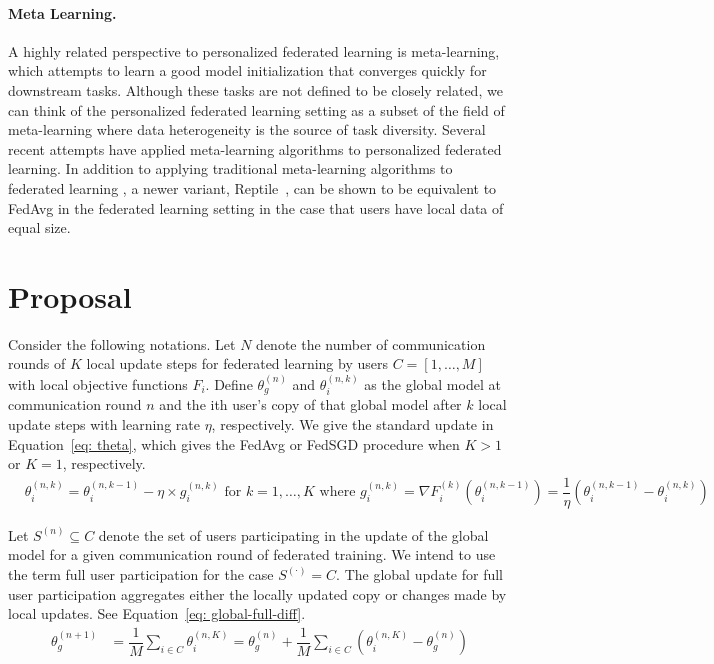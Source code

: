 \documentclass{article}
\begin{document}
%
\paragraph{Meta Learning.}
A highly related perspective to personalized federated learning is meta-learning, which attempts to learn a good model initialization that converges quickly for downstream tasks.
Although these tasks are not defined to be closely related, we can think of the personalized federated learning setting as a subset of the field of meta-learning where data heterogeneity is the source of task diversity. 
Several recent attempts have applied meta-learning algorithms to personalized federated learning.
In addition to applying traditional meta-learning algorithms to federated learning \citep{maml}, a newer variant, Reptile~\citep{reptile}, can be shown to be equivalent to FedAvg in the federated learning setting in the case that users have local data of equal size.




%
\section{Proposal}

Consider the following notations.
Let $N$ denote the number of communication rounds of $K$ local update steps for federated learning by users $C = \left[1, \ldots, M \right]$ with local objective functions $F_i$.
Define $\theta_g^{(n)}$ and $\theta_i^{(n, k)}$ as the global model at communication round $n$ and the ith user's copy of that global model after $k$ local update steps with learning rate $\eta$, respectively.
We give the standard update in Equation~\ref{eq: theta}, which gives the FedAvg or FedSGD procedure when $K > 1$ or $K = 1$, respectively.
\begin{align}
    & \theta_i^{(n, k)} = \theta_i^{(n, k - 1)} - \eta \times g_i^{(n, k)} \textrm{ for } k = 1, \ldots, K \label{eq: theta} \textrm{ where } g_i^{(n, k)} = \nabla F_i^{(k)}(\theta_i^{(n, k - 1)}) = \dfrac{1}{\eta} \left( \theta_i^{(n, k - 1)} - \theta_i^{(n, k)} \right) \nonumber
\end{align}

Let $S^{(n)} \subseteq C$ denote the set of users participating in the update of the global model for a given communication round of federated training.
We intend to use the term full user participation for the case $S^{(\cdot)} = C$. 
The global update for full user participation aggregates either the locally updated copy or changes made by local updates. 
See Equation~\ref{eq: global-full-diff}.
\begin{align}
    \theta_g^{(n + 1)} &= \dfrac{1}{M} \sum_{i \in C} \theta_i^{(n, K)} = \theta_g^{(n)} + \dfrac{1}{M} \sum_{i \in C} \left( \theta_i^{(n, K)} - \theta_g^{(n)} \right) \label{eq: global-full-diff}
\end{align}
\end{document}
